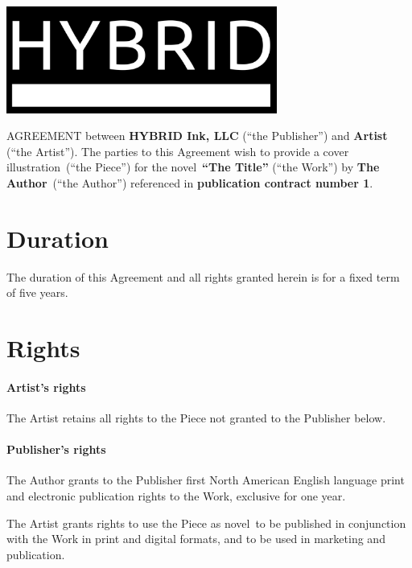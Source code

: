 \documentclass[12pt,letterpaper]{article}
\def\WorkTitle{The Title}
\def\WorkAuthor{The Author}
\def\WorkType{novel}
\def\Artist{Artist}
\def\ArtType{a cover illustration}
\def\RelatedContract{1}
\begin{document}
\begin{center}
\noindent\includegraphics[width=3.5in]{logo}
\end{center}

\vspace{0.5in}

\noindent AGREEMENT between \textbf{HYBRID Ink, LLC} (``the Publisher'') and \textbf{\Artist} (``the Artist''). The parties to this Agreement wish to provide \ArtType\ (``the Piece'') for the \WorkType\ \textbf{``\WorkTitle''} (``the Work'') by \textbf{\WorkAuthor}\ (``the Author'') referenced in \textbf{publication contract number \RelatedContract}.

\section{Duration}

The duration of this Agreement and all rights granted herein is for a fixed term of five years.

\section{Rights}

\paragraph{Artist's rights}

The Artist retains all rights to the Piece not granted to the Publisher below.

\paragraph{Publisher's rights}

The Author grants to the Publisher first North American English language print and electronic publication rights to the Work, exclusive for one year.

The Artist grants rights to use the Piece as \WorkType\ to be published in conjunction with the Work in print and digital formats, and to be used in marketing and publication.
\end{document}
